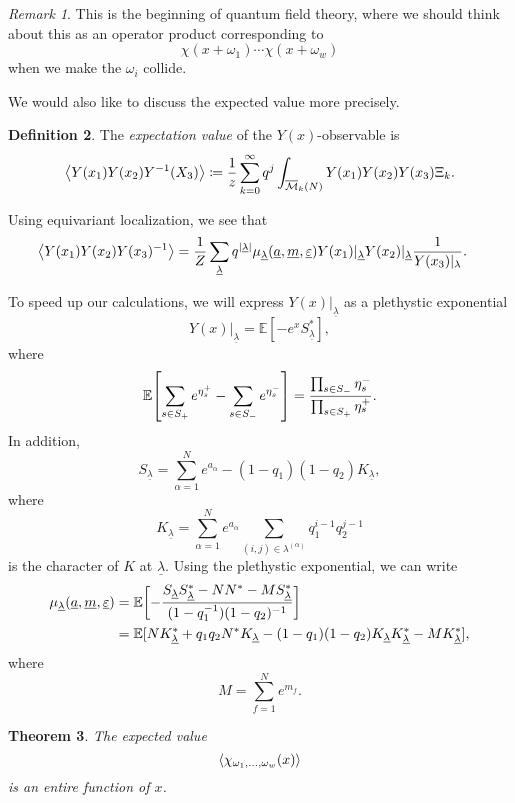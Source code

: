 \documentclass[leqno, openany]{memoir}
\newtheorem{thm}{Theorem}[section]
\theoremstyle{definition}
\newtheorem{defn}[thm]{Definition}
\theoremstyle{remark}
\newtheorem{rmk}[thm]{Remark}
\theoremstyle{plain}
\theoremstyle{definition}
\theoremstyle{remark}
\newcommand{\E}{\mathbb{E}}
\newcommand{\ep}{\varepsilon}
\newcommand{\mc}[1]{\mathcal{#1}}
\newcommand{\ol}[1]{\overline{#1}}
\newcommand{\ul}[1]{\underline{#1}}
\begin{document}
\begin{rmk}
    This is the beginning of quantum field theory, where we should think about this as an operator product corresponding to
    \[ \chi(x+\omega_1) \cdots \chi(x+\omega_w) \]
    when we make the $\omega_i$ collide.
\end{rmk}


We would also like to discuss the expected value more precisely.
\begin{defn}
    The \textit{expectation value} of the $Y(x)$-observable is
    \[ \ev{Y(x_1) Y(x_2) Y^{-1}(X_3)} \coloneqq \frac{1}{z} \sum_{k=0}^{\infty} q^j \int_{\ol{\mc{M}}_k(N)} Y(x_1) Y(x_2) Y(x_3) \Xi_k . \]
\end{defn}

Using equivariant localization, we see that
\begin{align*}
    \ev{Y(x_1) Y(x_2) Y(x_3)^{-1}} &= \frac{1}{Z} \sum_{\ul{\lambda}} q^{\abs{\ul{\lambda}}} \mu_{\ul{\lambda}}(\ul{a}, \ul{m}, \ul{\ep}) Y(x_1)|_{\ul{\lambda}} Y(x_2)|_{\ul{\lambda}} \frac{1}{Y(x_3)|_{\lambda}}.
\end{align*}

To speed up our calculations, we will express $Y(x)|_{\ul{\lambda}}$ as a plethystic exponential
\[ Y(x)|_{\ul{\lambda}} = \E [-e^x S_{\ul{\lambda}}^*], \]
where
\[ \E\qty[\sum_{s \in S_+} e^{\eta_s^+} - \sum_{s \in S_-} e^{\eta_s^-}] = \frac{\prod_{s \in S_-} \eta_s^-}{\prod_{s \in S_+}\eta_s^+}. \]
In addition, 
\[ S_{\ul{\lambda}} = \sum_{\alpha=1}^N e^{a_{\alpha}} - (1-q_1)(1-q_2)K_{\ul{\lambda}}, \]
where
\[ K_{\ul{\lambda}} = \sum_{\alpha=1}^N e^{a_{\alpha}} \sum_{(i,j) \in \lambda^{(\alpha)}} q_1^{i-1} q_2^{j-1} \]
is the character of $K$ at $\ul{\lambda}$. Using the plethystic exponential, we can write
\begin{align*}
    \mu_{\ul{\lambda}}(\ul{a}, \ul{m}, \ul{\ep}) &= \E \qty[- \frac{S_{\ul{\lambda}} S_{\ul{\lambda}}^* - NN^* - MS_{\ul{\lambda}}^*}{(1-q_1^{-1})(1-q_2)^{-1}}] \\
    &= \E [N K_{\ul{\lambda}}^* + q_1 q_2 N^* K_{\ul{\lambda}} - (1-q_1)(1-q_2)K_{\ul{\lambda}}K_{\ul{\lambda}}^* - M K_{\ul{\lambda}}^*],
\end{align*}
where
\[ M = \sum_{f=1}^N e^{m_f}. \]

\begin{thm}
    The expected value
    \[ \ev{\chi_{\omega_1, \ldots, \omega_w}(x)} \]
    is an entire function of $x$.
\end{thm}
\end{document}
